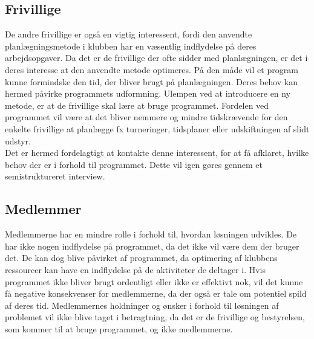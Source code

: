 \subsection*{Frivillige}
De andre frivillige er også en vigtig interessent, fordi den anvendte planlægningsmetode i klubben har en væsentlig indflydelse på deres arbejdsopgaver. Da det er de frivillige der ofte sidder med planlægningen, er det i deres interesse at den anvendte metode optimeres. På den måde vil et program kunne formindske den tid, der bliver brugt på planlægningen. Deres behov kan hermed påvirke programmets udformning. Ulempen ved at introducere en ny metode, er at de frivillige skal lære at bruge programmet. Fordelen ved programmet vil være at det bliver nemmere og mindre tidskrævende for den enkelte frivillige at planlægge fx turneringer, tidsplaner eller udskiftningen af slidt udstyr.\\
Det er hermed fordelagtigt at kontakte denne interessent, for at få afklaret, hvilke behov der er i forhold til programmet. Dette vil igen gøres gennem et semistruktureret interview.

\subsection*{Medlemmer}
Medlemmerne har en mindre rolle i forhold til, hvordan løsningen udvikles. De har ikke nogen indflydelse på programmet, da det ikke vil være dem der bruger det. De kan dog blive påvirket af programmet, da optimering af klubbens ressourcer kan have en indflydelse på de aktiviteter de deltager i. Hvis programmet ikke bliver brugt ordentligt eller ikke er effektivt nok, vil det kunne få negative konsekvenser for medlemmerne, da der også er tale om potentiel spild af deres tid. Medlemmernes holdninger og ønsker i forhold til løsningen af problemet vil ikke blive taget i betragtning, da det er de frivillige og bestyrelsen, som kommer til at bruge programmet, og ikke medlemmerne.

